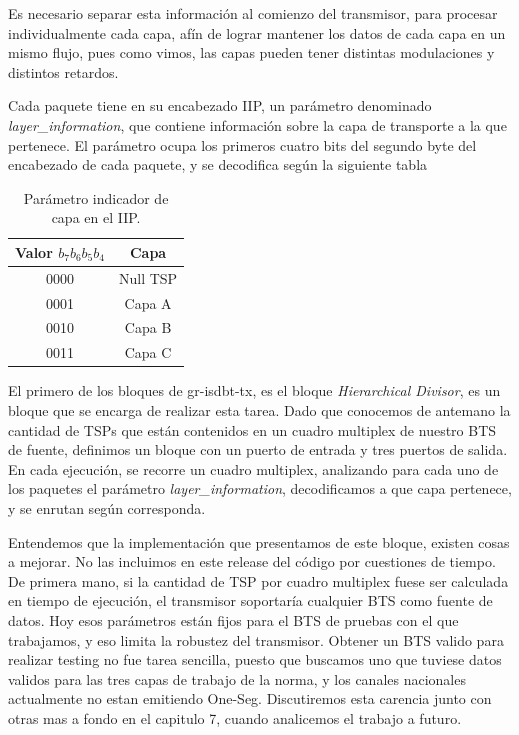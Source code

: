 Es necesario separar esta información al comienzo del transmisor, para procesar individualmente cada capa, afín de lograr mantener los datos de cada capa en un mismo flujo, pues como vimos, las capas pueden tener distintas modulaciones y distintos retardos. 

Cada paquete tiene en su encabezado IIP, un parámetro denominado \textit{layer\_information}, que contiene información sobre la capa de transporte a la que pertenece. El parámetro ocupa los primeros cuatro bits del segundo byte del encabezado de cada paquete, y se decodifica según la siguiente tabla

\begin{table}[h!]
	\centering
	\begin{tabular}{|c|c|}
		\hline
		\textbf{Valor $b_{7}b_{6}b_{5}b_{4}$} & \textbf{Capa}\\
		\hline
		0000 		& Null TSP\\
		\hline
		0001 		& Capa A\\
		\hline
		0010 		& Capa B\\
		\hline
		0011 		& Capa C\\
		\hline
	\end{tabular}
	\caption{\label{Identificador de capa para TSP} Par\'ametro indicador de capa en el IIP.}
\end{table}

El primero de los bloques de gr-isdbt-tx, es el bloque \textit{Hierarchical Divisor}, es un bloque que se encarga de realizar esta tarea. Dado que conocemos de antemano la cantidad de TSPs que están contenidos en un cuadro multiplex de nuestro BTS de fuente, definimos un bloque con un puerto de entrada y tres puertos de salida. En cada ejecución, se recorre un cuadro multiplex, analizando para cada uno de los paquetes el parámetro \textit{layer\_information}, decodificamos a que capa pertenece, y se enrutan según corresponda. 

Entendemos que la implementación que presentamos de este bloque, existen cosas a mejorar. No las incluimos en este release del código por cuestiones de tiempo. De primera mano, si la cantidad de TSP por cuadro multiplex fuese ser calculada en tiempo de ejecución, el transmisor soportaría cualquier BTS como fuente de datos. Hoy esos parámetros están fijos para el BTS de pruebas con el que trabajamos, y eso limita la robustez del transmisor. Obtener un BTS valido para realizar testing no fue tarea sencilla, puesto que buscamos uno que tuviese datos validos para las tres capas de trabajo de la norma, y los canales nacionales actualmente no estan emitiendo One-Seg. Discutiremos esta carencia junto con otras mas a fondo en el capitulo 7, cuando analicemos el trabajo a futuro.

